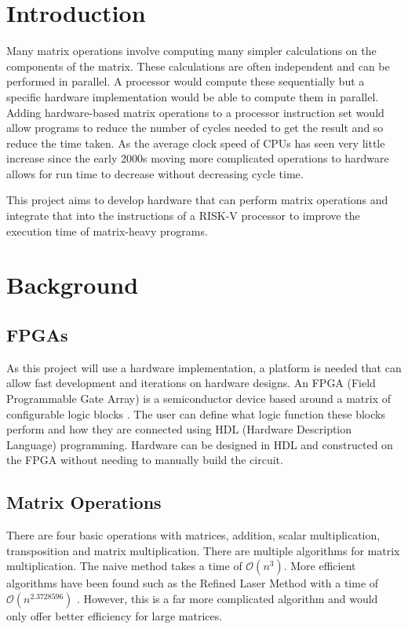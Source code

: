 \documentclass[a4paper,fleqn,12pt]{article}
\begin{document}
	
	
	
	\pagestyle{plain}
	
	\section{Introduction}
	Many matrix operations involve computing many simpler calculations on the components of the matrix. These calculations are often independent and can be performed in parallel. A processor would compute these sequentially but a specific hardware implementation would be able to compute them in parallel. Adding hardware-based matrix operations to a processor instruction set would allow programs to reduce the number of cycles needed to get the result and so reduce the time taken. As the average clock speed of CPUs has seen very little increase since the early 2000s moving more complicated operations to hardware allows for run time to decrease without decreasing cycle time.
	
	This project aims to develop hardware that can perform matrix operations and integrate that into the instructions of a RISK-V processor to improve the execution time of matrix-heavy programs.
	
	\section{Background}
	\subsection{FPGAs}
	As this project will use a hardware implementation, a platform is needed that can allow fast development and iterations on hardware designs. An FPGA (Field Programmable Gate Array) is a semiconductor device based around a matrix of configurable logic blocks \citep{whatisanfpga}. The user can define what logic function these blocks perform and how they are connected using HDL (Hardware Description Language) programming. Hardware can be designed in HDL and constructed on the FPGA without needing to manually build the circuit.
	
	\subsection{Matrix Operations}
	There are four basic operations with matrices, addition, scalar multiplication, transposition and matrix multiplication. There are multiple algorithms for matrix multiplication. The naive method takes a time of $\mathcal{O}(n^{3})$. More efficient algorithms have been found such as the Refined Laser Method with a time of $\mathcal{O}(n^{2.3728596})$ \citep{alman2020refined}. However, this is a far more complicated algorithm and would only offer better efficiency for large matrices.
	
\end{document}

